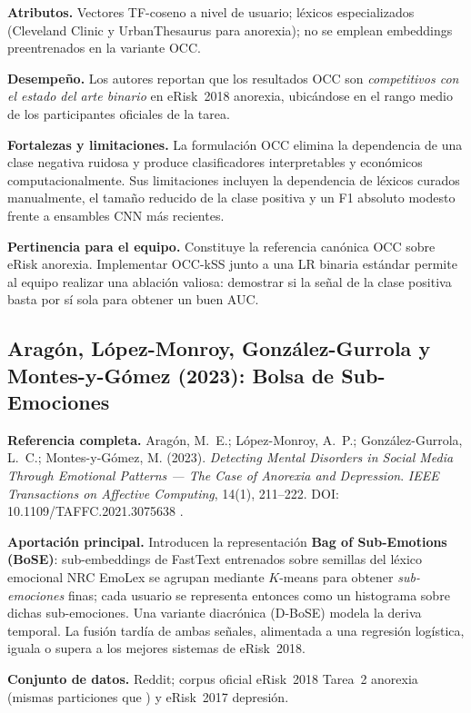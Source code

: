 \documentclass[journal]{IEEEtran}
\begin{document}
\textbf{Atributos.} Vectores TF-coseno a nivel de usuario; léxicos especializados (Cleveland Clinic y UrbanThesaurus para anorexia); no se emplean embeddings preentrenados en la variante OCC.

\textbf{Desempeño.} Los autores reportan que los resultados OCC son \emph{competitivos con el estado del arte binario} en eRisk~2018 anorexia, ubicándose en el rango medio de los participantes oficiales de la tarea.

\textbf{Fortalezas y limitaciones.} La formulación OCC elimina la dependencia de una clase negativa ruidosa y produce clasificadores interpretables y económicos computacionalmente. Sus limitaciones incluyen la dependencia de léxicos curados manualmente, el tamaño reducido de la clase positiva y un F1 absoluto modesto frente a ensambles CNN más recientes.

\textbf{Pertinencia para el equipo.} Constituye la referencia canónica OCC sobre eRisk anorexia. Implementar OCC-kSS junto a una LR binaria estándar permite al equipo realizar una ablación valiosa: demostrar si la señal de la clase positiva basta por sí sola para obtener un buen AUC.

\subsection{Aragón, López-Monroy, González-Gurrola y Montes-y-Gómez (2023): Bolsa de Sub-Emociones}

\textbf{Referencia completa.} Aragón, M.~E.; López-Monroy, A.~P.; González-Gurrola, L.~C.; Montes-y-Gómez, M. (2023). \emph{Detecting Mental Disorders in Social Media Through Emotional Patterns --- The Case of Anorexia and Depression}. \textit{IEEE Transactions on Affective Computing}, 14(1), 211--222. DOI: 10.1109/TAFFC.2021.3075638 \cite{aragon2023bose}.

\textbf{Aportación principal.} Introducen la representación \textbf{Bag of Sub-Emotions (BoSE)}: sub-embeddings de FastText entrenados sobre semillas del léxico emocional NRC EmoLex se agrupan mediante $K$-means para obtener \emph{sub-emociones} finas; cada usuario se representa entonces como un histograma sobre dichas sub-emociones. Una variante diacrónica (D-BoSE) modela la deriva temporal. La fusión tardía de ambas señales, alimentada a una regresión logística, iguala o supera a los mejores sistemas de eRisk~2018.

\textbf{Conjunto de datos.} Reddit; corpus oficial eRisk~2018 Tarea~2 anorexia (mismas particiones que \cite{aguilera2021oneclass}) y eRisk~2017 depresión.
\end{document}

